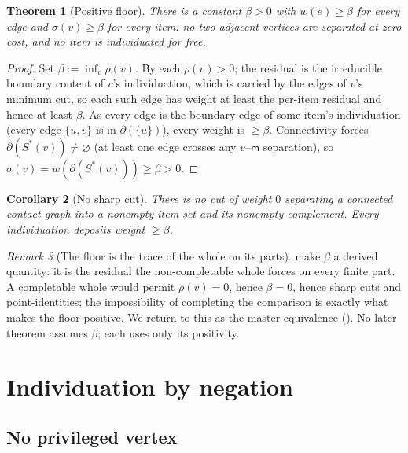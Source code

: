 \documentclass[11pt,twocolumn,a4paper]{article}
\theoremstyle{thmstyle}
\newtheorem{theorem}{Theorem}[section]
\newtheorem{corollary}[theorem]{Corollary}
\theoremstyle{definition}
\theoremstyle{remark}
\newtheorem{remark}[theorem]{Remark}
\newcommand{\wt}{w}
\newcommand{\med}{\mathsf{m}}            %
\newcommand{\flo}{\beta}                 %
\newcommand{\cut}{\partial}              %
\newcommand{\res}{\rho}                  %
\newcommand{\str}{\sigma}                %
\begin{document}
\begin{theorem}[Positive floor]
\label{thm:floor}
There is a constant $\flo>0$ with $\wt(e)\ge\flo$ for every edge and
$\str(v)\ge\flo$ for every item: no two adjacent vertices are separated at
zero cost, and no item is individuated for free.
\end{theorem}

\begin{proof}
Set $\flo:=\inf_v\res(v)$. By  each $\res(v)>0$;
the residual is the irreducible boundary content of $v$'s individuation,
which is carried by the edges of $v$'s minimum cut, so each such edge has
weight at least the per-item residual and hence at least $\flo$. As every
edge is the boundary edge of some item's individuation (every edge
$\{u,v\}$ is in $\cut(\{u\})$), every weight is $\ge\flo$. Connectivity
forces $\cut(S^{\ast}(v))\neq\varnothing$ (at least one edge crosses any
$v$--$\med$ separation), so
$\str(v)=\wt(\cut(S^{\ast}(v)))\ge\flo>0$.
\end{proof}

\begin{corollary}[No sharp cut]
\label{cor:no-sharp}
There is no cut of weight $0$ separating a connected contact graph into a
nonempty item set and its nonempty complement. Every individuation
deposits weight $\ge\flo$.
\end{corollary}

\begin{remark}[The floor is the trace of the whole on its parts]
\label{rem:trace}
 make $\flo$ a derived quantity: it is
the residual the non-completable whole forces on every finite part.
A completable whole would permit $\res(v)=0$, hence $\flo=0$, hence sharp
cuts and point-identities; the impossibility of completing the comparison
is exactly what makes the floor positive. We return to this as the master
equivalence (). No later theorem assumes $\flo$; each
uses only its positivity.
\end{remark}

\section{Individuation by negation}
\label{sec:negation}

\subsection{No privileged vertex}
\end{document}
